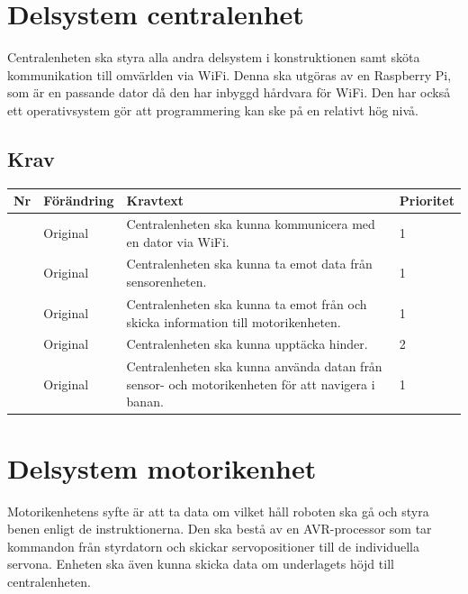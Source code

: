 \documentclass[a4paper,titlepage,12pt]{article}
\newcounter{reqNr}
\newcommand{\nextReqNr}{\stepcounter{reqNr}\arabic{reqNr}}
\begin{document}
	\section{Delsystem centralenhet}
	Centralenheten ska styra alla andra delsystem i konstruktionen samt sköta
	kommunikation till omvärlden via WiFi. Denna ska utgöras av en Raspberry
	Pi, som är en passande dator då den har inbyggd hårdvara för WiFi. Den har 
	också ett operativsystem gör att programmering kan ske på en relativt hög nivå.

	\subsection{Krav}
	\begin{longtable}[c]{ c l>{\raggedright}p{} l }
		\textbf{Nr} & \textbf{Förändring} & \textbf{Kravtext} & \textbf{Prioritet} 
			\\ \midrule

		\nextReqNr{} & Original & Centralenheten ska kunna kommunicera 
			med en dator via WiFi. & 1
			\\ \midrule

		\nextReqNr & Original & Centralenheten ska kunna ta emot 
			data från sensorenheten.& 1
			\\ \midrule


		\nextReqNr & Original & Centralenheten ska kunna ta emot från
			 och skicka information till motorikenheten. & 1
			\\ \midrule

		\nextReqNr{} & Original & Centralenheten ska kunna upptäcka hinder. & 2
		\\ \midrule

		\nextReqNr{} & Original & Centralenheten ska kunna använda
		datan från sensor- och motorikenheten för att navigera i banan.  & 1
	\end{longtable}




	\section{Delsystem motorikenhet}
	Motorikenhetens syfte är att ta data om vilket håll roboten ska gå och styra benen enligt de
	instruktionerna. Den ska bestå av en AVR-processor som tar kommandon från styrdatorn och skickar
	servopositioner till de individuella servona. Enheten ska även kunna skicka data om underlagets
	höjd till centralenheten.
\end{document}
